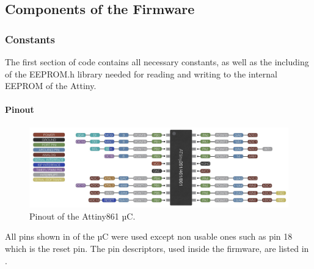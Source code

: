 \subsection{Components of the Firmware}
\label{Components of the Firmware}

\subsubsection{Constants}
The first section of code contains all necessary constants, as well as the including of the EEPROM.h library needed for reading and writing to the internal EEPROM of the Attiny.

\paragraph{Pinout}

\begin{figure}[!ht]
    \centering
    \includegraphics[width=13cm]{./Figures/attiny861_pinout.jpg}
    \caption{Pinout of the Attiny861 µC.}
    \label{fig:attiny861_pinout}     
\end{figure}


\noindent All pins shown in  of the µC were used except non usable ones such as pin 18 which is the reset pin. The pin descriptors, used inside the firmware, are listed in .

